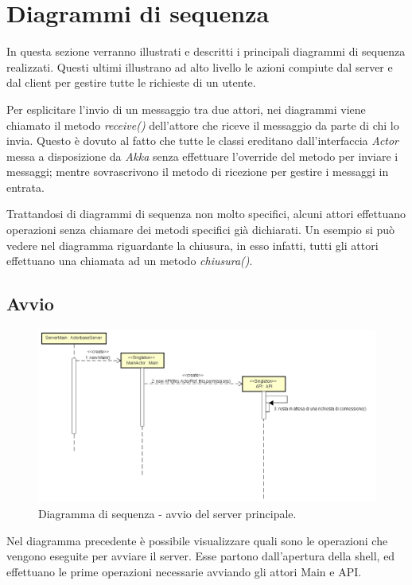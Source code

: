 \documentclass[a4paper]{article}
\begin{document}
                
	\newpage 
	\section{Diagrammi di sequenza}
        In questa sezione verranno illustrati e descritti i principali diagrammi di sequenza realizzati. Questi ultimi illustrano ad alto livello le azioni 
        compiute dal server e dal client per gestire tutte le richieste di un utente.
        
        Per esplicitare l'invio di un messaggio tra due attori, nei diagrammi viene chiamato il metodo \textit{receive()} dell'attore che riceve il messaggio 
        da parte di chi lo invia.
        Questo è dovuto al fatto che tutte le classi ereditano dall'interfaccia \textit{Actor} messa a disposizione da \textit{Akka} senza effettuare 
        l'override del metodo per inviare i messaggi; mentre sovrascrivono il metodo di ricezione per gestire i messaggi in entrata.
        
        Trattandosi di diagrammi di sequenza non molto specifici, alcuni attori effettuano operazioni senza chiamare dei metodi specifici già 
        dichiarati. Un esempio si può vedere nel diagramma riguardante la chiusura, in esso infatti, tutti gli attori effettuano una chiamata ad un metodo 
        \textit{chiusura()}.
       
       \subsection{Avvio}
            \begin{figure} [H]
				\centering
				\includegraphics[width=\textwidth]{ST/seq/AvvioMain.png}
				\caption{Diagramma di sequenza - avvio del server principale.}
			\end{figure}
            Nel diagramma precedente è possibile visualizzare quali sono le operazioni che vengono eseguite per avviare il server. Esse partono dall'apertura 
            della shell, ed effettuano le prime operazioni necessarie avviando gli attori Main e API.
             
\end{document}
